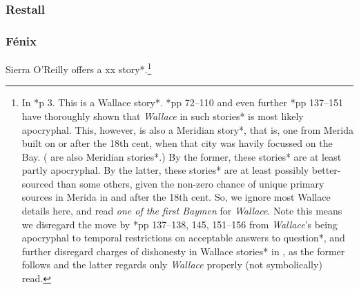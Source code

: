 \documentclass{amsart}
\newcommand{\mention}[1]{\textit{#1}}%
\theoremstyle{definition}
\theoremstyle{remark}
\begin{document}
		\subsubsection{Restall}
		\label{sss:restall}
		\subsubsection{Fénix}
		\label{sss:fenix} Sierra O'Reilly offers a xx story*.\footnote{In \cite{fen49}*{p 3}. This is a Wallace story*. \cite{cam09}*{pp 72--110} and even further \cite{bul16}*{pp 137--151} have thoroughly shown that \mention{Wallace} in such stories* is most likely apocryphal. This, however, is also a Meridian story*, that is, one from Merida built on or after the 18th cent, when that city was havily focussed on the Bay. ( are also Meridian stories*.) By the former, these stories* are at least partly apocryphal. By the latter, these stories* are at least possibly better-sourced than some others, given the non-zero chance of unique primary sources in Merida in and after the 18th cent. So, we ignore most Wallace details here, and read \mention{one of the first Baymen} for \mention{Wallace}. Note this means we disregard the move by \cite{bul16}*{pp 137--138, 145, 151--156} from \mention{Wallace}'s being apocryphal to temporal restrictions on acceptable answers to question*, and further disregard charges of dishonesty in Wallace stories* in , as the former follows and the latter regards only \mention{Wallace} properly (not symbolically) read.}
\end{document}

